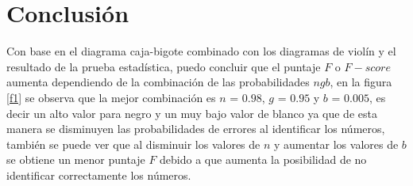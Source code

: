 \documentclass{article}
\begin{document}
\newpage
\section{Conclusi\'{o}n}
Con base en el diagrama caja-bigote combinado con los diagramas de violín y el resultado de la prueba estadística, puedo concluir que el puntaje $F$ o $F-score$ aumenta dependiendo de la combinación de las probabilidades $ngb$, en la figura \ref{f1} se observa que la mejor combinación es $n$ = $0.98$, $g$ = $0.95$ y $b$ = $0.005$, es decir un alto valor para negro y un muy bajo valor de blanco ya que de esta manera se disminuyen las probabilidades de errores al identificar los números, también se puede ver que al disminuir los valores de $n$ y aumentar los valores de $b$ se obtiene un menor puntaje $F$ debido a que aumenta la posibilidad de no identificar correctamente los números. 
\smallskip

\newpage



\end{document}
